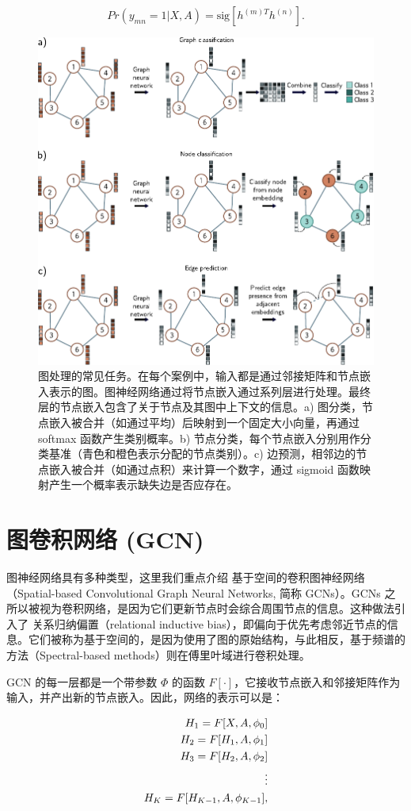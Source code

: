 \documentclass[lang=cn,newtx,10pt,scheme=chinese]{elegantbook}
\begin{document}
\begin{equation}
Pr(y_{mn} = 1|X, A) = \text{sig}\left[h^{(m)T}h^{(n)} \right]. 
\end{equation}
\begin{figure}[ht!]
\centering
\includegraphics[width=0.7\linewidth]{PDFFigures/UDLChap13PDF/GraphProblems.pdf}
\caption{图处理的常见任务。在每个案例中，输入都是通过邻接矩阵和节点嵌入表示的图。图神经网络通过将节点嵌入通过系列层进行处理。最终层的节点嵌入包含了关于节点及其图中上下文的信息。a) 图分类，节点嵌入被合并（如通过平均）后映射到一个固定大小向量，再通过 softmax 函数产生类别概率。b) 节点分类，每个节点嵌入分别用作分类基准（青色和橙色表示分配的节点类别）。c) 边预测，相邻边的节点嵌入被合并（如通过点积）来计算一个数字，通过 sigmoid 函数映射产生一个概率表示缺失边是否应存在。}
\end{figure}


\section{图卷积网络 (GCN)}
图神经网络具有多种类型，这里我们重点介绍 基于空间的卷积图神经网络（Spatial-based Convolutional Graph Neural Networks, 简称 GCNs）。GCNs 之所以被视为卷积网络，是因为它们更新节点时会综合周围节点的信息。这种做法引入了 关系归纳偏置（relational inductive bias），即偏向于优先考虑邻近节点的信息。它们被称为基于空间的，是因为使用了图的原始结构，与此相反，基于频谱的方法（Spectral-based methods）则在傅里叶域进行卷积处理。

GCN 的每一层都是一个带参数 \(\Phi\) 的函数 \(F[\cdot]\)，它接收节点嵌入和邻接矩阵作为输入，并产出新的节点嵌入。因此，网络的表示可以是：


\begin{align}
H_1 = F[X, A, \phi_0] \notag \\
H_2 = F[H_1, A, \phi_1] \notag \\
H_3 = F[H_2, A, \phi_2] \notag \\
\vdots \notag \\
H_K = F[H_{K-1}, A, \phi_{K-1}], 
\end{align} 
\end{document}

